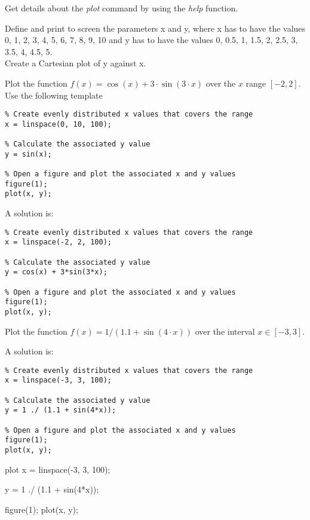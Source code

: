\begin{ex}
Get details about the \emph{plot} command by using the \emph{help} function.
\end{ex}



\begin{ex}
Define and print to screen the parameters x and y, where x has to have the values 0, 1,
2, 3, 4, 5, 6, 7, 8, 9, 10 and y has to have the values 0, 0.5, 1, 1.5, 2, 2.5, 3, 3.5, 4, 4.5,
5.\\
Create a Cartesian plot of y against x.
\end{ex}


\begin{ex}
Plot the function $f(x) = \cos(x) + 3 \cdot \sin(3 \cdot x)$
over the $x$ range $[-2, 2]$.
Use the following template 
\begin{lstlisting}
% Create evenly distributed x values that covers the range
x = linspace(0, 10, 100);

% Calculate the associated y value
y = sin(x);

% Open a figure and plot the associated x and y values
figure(1);
plot(x, y);
\end{lstlisting}
\begin{sol}
A solution is:
\begin{lstlisting}
% Create evenly distributed x values that covers the range
x = linspace(-2, 2, 100);

% Calculate the associated y value
y = cos(x) + 3*sin(3*x);

% Open a figure and plot the associated x and y values
figure(1);
plot(x, y);
\end{lstlisting}
\end{sol}
\end{ex}



\begin{ex}
Plot the function $f(x) = 1 / (1.1 + \sin(4 \cdot x))$
over the interval $x \in [-3, 3]$.
\begin{sol}
A solution is:
\begin{lstlisting}
% Create evenly distributed x values that covers the range
x = linspace(-3, 3, 100);

% Calculate the associated y value
y = 1 ./ (1.1 + sin(4*x));

% Open a figure and plot the associated x and y values
figure(1);
plot(x, y);
\end{lstlisting}
\end{sol}
\begin{solutionfile}{plot}
x = linspace(-3, 3, 100);

y = 1 ./ (1.1 + sin(4*x));

figure(1);
plot(x, y);
\end{solutionfile}
\end{ex}
